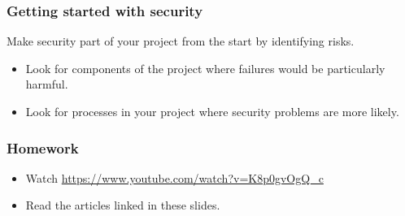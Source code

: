 \documentclass[10pt]{beamer}
\begin{document}
\begin{frame}
	\frametitle{Getting started with security}

	Make security part of your project from the start by identifying risks.

	\begin{itemize}
		\item Look for components of the project where
			failures would be particularly harmful.
		\item Look for processes in your project where security
			problems are more likely.
	\end{itemize}
\end{frame}

\begin{frame}
	\frametitle{Homework}
	
	
	
	\begin{itemize}
		\item Watch \url{https://www.youtube.com/watch?v=K8p0gvOgQ_c}
		\item Read the articles linked in these slides.
	\end{itemize}
\end{frame}
\end{document}
